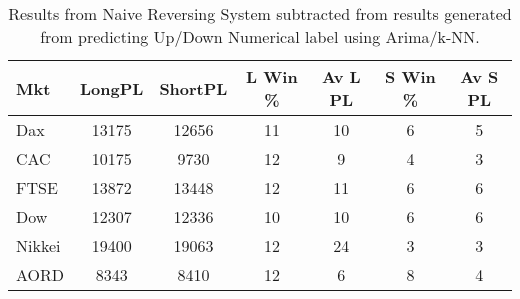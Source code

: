 \begin{table}[ht]
\centering
\caption[Predicting UpDn 01 - Arima/k-NN predictions passed to System 3.]{Results from Naive Reversing System subtracted from results generated from predicting Up/Down Numerical label using Arima/k-NN.} 
\label{tab:chp_ts:pUD_01_arima_knn_sys_diff}
\begin{tabular}{lcccccc}
  \toprule Mkt & LongPL & ShortPL & L Win \% & Av L PL & S Win \% & Av S PL \\ 
  \midrule Dax & 13175 & 12656 & 11 & 10 & 6 & 5 \\ 
  CAC & 10175 & 9730 & 12 & 9 & 4 & 3 \\ 
  FTSE & 13872 & 13448 & 12 & 11 & 6 & 6 \\ 
  Dow & 12307 & 12336 & 10 & 10 & 6 & 6 \\ 
  Nikkei & 19400 & 19063 & 12 & 24 & 3 & 3 \\ 
  AORD & 8343 & 8410 & 12 & 6 & 8 & 4 \\ 
   \bottomrule \end{tabular}
\end{table}
